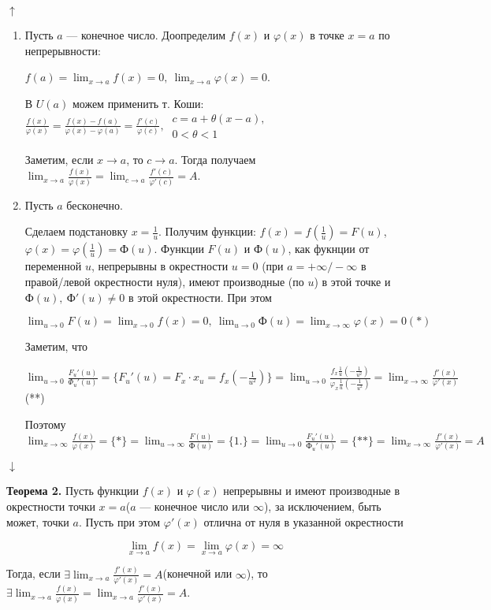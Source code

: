 \documentclass{article}
\begin{document}
    \(\uparrow\)
    \begin{enumerate}
        \item Пусть \(a\) --- конечное число. Доопределим \(f(x)\) и \(\varphi(x)\) в точке \(x=a\) по непрерывности:

        \(f(a) = \lim_{x \to a} f(x) = 0,\ \lim_{x \to a} \varphi(x) = 0\).

        В \(U(a)\) можем применить т. Коши: \(\frac{f(x)}{\varphi(x)} = \frac{f(x) - f(a)}{\varphi(x) - \varphi(a)} = \frac{f'(c)}{\varphi(c)},\ \begin{array}{l} c = a + \theta(x-a),\\ 0 < \theta < 1\end{array}\)

        Заметим, если \(x \to a\), то \(c \to a\). Тогда получаем \(\lim_{x \to a} \frac{f(x)}{\varphi(x)} = \lim_{c \to a} \frac{f'(c)}{\varphi'(c)} = A\).
        
        \item Пусть $a$ бесконечно.
        
        Сделаем подстановку \( x = \frac{1}{u} \). Получим функции: \( f(x) = f(\frac{1}{u}) = F(u) \), \( \varphi(x) = \varphi(\frac{1}{u}) = \textrm{Ф}(u) \). Функции \( F(u) \) и \( \textrm{Ф}(u) \), как фукнции от переменной $u$, непрерывны в окрестности $u = 0$ (при $a = +\infty/-\infty$ в правой/левой окрестности нуля), имеют производные (по $u$) в этой точке и \( \textrm{Ф}(u),\ \textrm{Ф}'(u) \neq 0 \) в этой окрестности. При этом

        \( \lim_{u \to 0}F(u) = \lim_{x \to 0}f(x) = 0,\ \lim_{u \to 0}\textrm{Ф}(u) = \lim_{x \to \infty}\varphi(x) = 0 (*) \) 
        
        Заметим, что 

        \(\lim_{u \to 0} \frac{F_u'(u)}{\Phi_u'(u)} = \{F_u'(u) = F_x \cdot x_u = f_x(-\frac{1}{u^2})\} = \lim_{u \to 0} \frac{f_x\frac{1}{u}(-\frac{1}{u^2})}{\varphi_x\frac{1}{u}(-\frac{1}{u^2})} = \lim_{x \to \infty} \frac{f'(x)}{\varphi'(x)}\)(**)
    
        Поэтому \( \lim_{x \to \infty}\frac{f(x)}{\varphi(x)} = \{*\} = \lim_{u \to \infty}\frac{F(u)}{\textrm{Ф}(u)} = \{1.\} = \lim_{u \to 0}\frac{F_u'(u)}{\textrm{Ф}_u'(u)} = \{**\} = \lim_{x \to \infty}\frac{f'(x)}{\varphi'(x)} = A \)
    \end{enumerate}
    \(\downarrow\)

    \textbf{Теорема 2.} Пусть функции \(f(x)\) и \(\varphi(x)\) непрерывны и имеют производные в окрестности точки \(x=a\)(\(a\) --- конечное число или \(\infty\)), за исключением, быть может, точки \(a\). Пусть при этом \(\varphi'(x)\) отлична от нуля в указанной окрестности

    \[\lim_{x \to a} f(x) = \lim_{x \to a} \varphi(x) = \infty\]

    Тогда, если \(\exists \lim_{x \to a} \frac{f'(x)}{\varphi'(x)} = A\)(конечной или \(\infty\)), то \(\exists \lim_{x \to a} \frac{f(x)}{\varphi(x)} = \lim_{x \to a} \frac{f'(x)}{\varphi'(x)} = A\).
\end{document}

